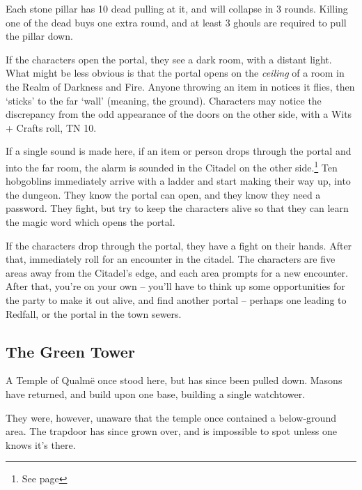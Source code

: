 \begin{multicols}{2}
Each stone pillar has 10 dead pulling at it, and will collapse in 3 rounds.  Killing one of the dead buys one extra round, and at least 3 ghouls are required to pull the pillar down.

If the characters open the portal, they see a dark room, with a distant light.  What might be less obvious is that the portal opens on the \emph{ceiling} of a room in the Realm of Darkness and Fire.  Anyone throwing an item in notices it flies, then `sticks' to the far `wall' (meaning, the ground).  Characters may notice the discrepancy from the odd appearance of the doors on the other side, with a Wits + Crafts roll, TN 10.

If a single sound is made here, if an item or person drops through the portal and into the far room, the alarm is sounded in the Citadel on the other side.\footnote{See page \pageref{darknessandfire}}
Ten hobgoblins immediately arrive with a ladder and start making their way up, into the dungeon.
They know the portal can open, and they know they need a password.
They fight, but try to keep the characters alive so that they can learn the magic word which opens the portal.

If the characters drop through the portal, they have a fight on their hands.  After that, immediately roll for an encounter in the citadel.  The characters are five areas away from the Citadel's edge, and each area prompts for a new encounter.  After that, you're on your own -- you'll have to think up some opportunities for the party to make it out alive, and find another portal -- perhaps one leading to Redfall, or the portal in the town sewers.

\subsection{The Green Tower}\label{green_tower}\setcounter{list}{0}

\begin{figure*}[t]

\label{green_tower_map}

\end{figure*}

A Temple of Qualm\"{e} once stood here, but has since been pulled down.  Masons have returned, and build upon one base, building a single watchtower.

They were, however, unaware that the temple once contained a below-ground area.  The trapdoor has since grown over, and is impossible to spot unless one knows it's there.


\end{multicols}
